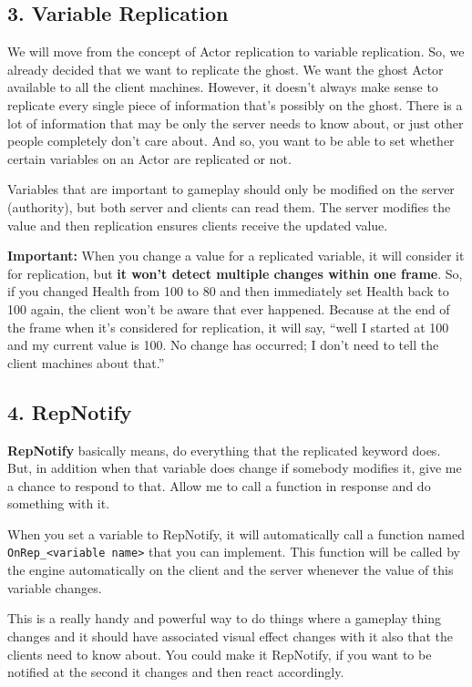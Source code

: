 \documentclass[
  letterpaper,
  DIV=11,
  numbers=noendperiod]{scrartcl}
\begin{document}
\subsection{3. Variable Replication}\label{variable-replication}

We will move from the concept of Actor replication to variable
replication. So, we already decided that we want to replicate the ghost.
We want the ghost Actor available to all the client machines. However,
it doesn't always make sense to replicate every single piece of
information that's possibly on the ghost. There is a lot of information
that may be only the server needs to know about, or just other people
completely don't care about. And so, you want to be able to set whether
certain variables on an Actor are replicated or not.

Variables that are important to gameplay should only be modified on the
server (authority), but both server and clients can read them. The
server modifies the value and then replication ensures clients receive
the updated value.

\textbf{Important:} When you change a value for a replicated variable,
it will consider it for replication, but \textbf{it won't detect
multiple changes within one frame}. So, if you changed Health from 100
to 80 and then immediately set Health back to 100 again, the client
won't be aware that ever happened. Because at the end of the frame when
it's considered for replication, it will say, ``well I started at 100
and my current value is 100. No change has occurred; I don't need to
tell the client machines about that.''

\subsection{4. RepNotify}\label{repnotify}

\textbf{RepNotify} basically means, do everything that the replicated
keyword does. But, in addition when that variable does change if
somebody modifies it, give me a chance to respond to that. Allow me to
call a function in response and do something with it.

When you set a variable to RepNotify, it will automatically call a
function named \texttt{OnRep\_\textless{}variable\ name\textgreater{}}
that you can implement. This function will be called by the engine
automatically on the client and the server whenever the value of this
variable changes.

This is a really handy and powerful way to do things where a gameplay
thing changes and it should have associated visual effect changes with
it also that the clients need to know about. You could make it
RepNotify, if you want to be notified at the second it changes and then
react accordingly.
\end{document}
